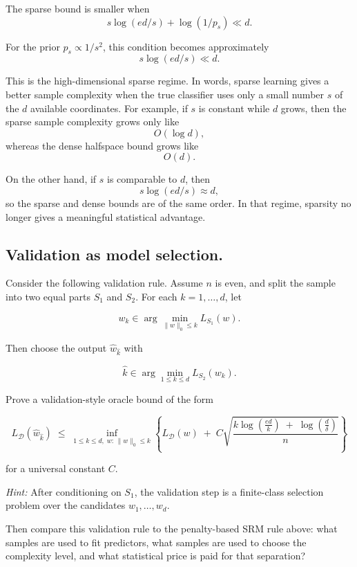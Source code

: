 \documentclass[11pt]{article}
\begin{document}
\begin{solutionbox}
The sparse bound is smaller when
\[
s\log(ed/s)+\log(1/p_s)
\ll
d.
\]

For the prior $p_s\propto 1/s^2$, this condition becomes approximately
\[
\boxed{
s\log(ed/s)\ll d.
}
\]

This is the high-dimensional sparse regime. In words, sparse learning gives a better sample complexity when the true classifier uses only a small number $s$ of the $d$ available coordinates. For example, if $s$ is constant while $d$ grows, then the sparse sample complexity grows only like
\[
O(\log d),
\]
whereas the dense halfspace bound grows like
\[
O(d).
\]

On the other hand, if $s$ is comparable to $d$, then
\[
s\log(ed/s)
\approx d,
\]
so the sparse and dense bounds are of the same order. In that regime, sparsity no longer gives a meaningful statistical advantage.

\end{solutionbox}


\subsection{Validation as model selection.}
Consider the following validation rule. Assume $n$ is even, and split the sample into two 
equal parts $S_1$ and $S_2$. For each $k = 1,\dots,d$, let


\[
w_k \in \arg\min_{\|w\|_0 \le k} L_{S_1}(w).
\]


Then choose the output $\hat{w}_{\hat{k}}$ with


\[
\hat{k} \in \arg\min_{1 \le k \le d} L_{S_2}(w_k).
\]



Prove a validation-style oracle bound of the form


\[
L_{\mathcal{D}}(\hat{w}_{\hat{k}})
\;\le\;
\inf_{1 \le k \le d,\; w:\,\|w\|_0 \le k}
\left\{
L_{\mathcal{D}}(w)
\;+\;
C \sqrt{
\frac{
k \log\!\left(\frac{e d}{k}\right)
\;+\;
\log\!\left(\frac{d}{\delta}\right)
}{
n}
}
\right\}
\]


for a universal constant $C$.

\noindent
\textit{Hint:} After conditioning on $S_1$, the validation step is a finite-class selection 
problem over the candidates $w_1,\dots,w_d$.

Then compare this validation rule to the penalty-based SRM rule above: what samples 
are used to fit predictors, what samples are used to choose the complexity level, and what 
statistical price is paid for that separation?
\end{document}
